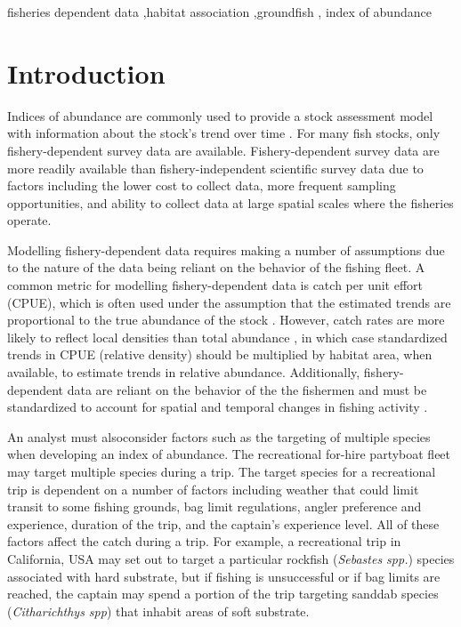 \documentclass[
  12pt,
  authoryear,
  preprint,
  3p]{elsarticle}
\begin{document}
\begin{frontmatter}
\begin{keyword}
    fisheries dependent data \sep habitat
association \sep groundfish \sep 
    index of abundance
\end{keyword}
\end{frontmatter}\ifdefined\Shaded\renewenvironment{Shaded}{\begin{tcolorbox}[interior hidden, borderline west={3pt}{0pt}{shadecolor}, frame hidden, enhanced, boxrule=0pt, breakable, sharp corners]}{\end{tcolorbox}}\fi

\hypertarget{introduction}{%
\section{Introduction}\label{introduction}}

Indices of abundance are commonly used to provide a stock assessment
model with information about the stock's trend over time
\citep{Harley:2001:CUE, Hilborn:1992:QFS}. For many fish stocks, only
fishery-dependent survey data are available. Fishery-dependent survey
data are more readily available than fishery-independent scientific
survey data due to factors including the lower cost to collect data,
more frequent sampling opportunities, and ability to collect data at
large spatial scales where the fisheries operate.

Modelling fishery-dependent data requires making a number of assumptions
due to the nature of the data being reliant on the behavior of the
fishing fleet. A common metric for modelling fishery-dependent data is
catch per unit effort (CPUE), which is often used under the assumption
that the estimated trends are proportional to the true abundance of the
stock \citep{Maunder:2004:SCE}. However, catch rates are more likely to
reflect local densities than total abundance
\citep{Haggarty:2006:CIR, Schnute:1995:IEP}, in which case standardized
trends in CPUE (relative density) should be multiplied by habitat area,
when available, to estimate trends in relative abundance. Additionally,
fishery-dependent data are reliant on the behavior of the the fishermen
and must be standardized to account for spatial and temporal changes in
fishing activity \citep{Campbell:2004:CSA, Hilborn:1992:QFS}.

An analyst must alsoconsider factors such as the targeting of multiple
species when developing an index of abundance. The recreational for-hire
partyboat fleet may target multiple species during a trip. The target
species for a recreational trip is dependent on a number of factors
including weather that could limit transit to some fishing grounds, bag
limit regulations, angler preference and experience, duration of the
trip, and the captain's experience level. All of these factors affect
the catch during a trip. For example, a recreational trip in California,
USA may set out to target a particular rockfish (\emph{Sebastes spp.})
species associated with hard substrate, but if fishing is unsuccessful
or if bag limits are reached, the captain may spend a portion of the
trip targeting sanddab species (\emph{Citharichthys spp}) that inhabit
areas of soft substrate.
\end{document}
